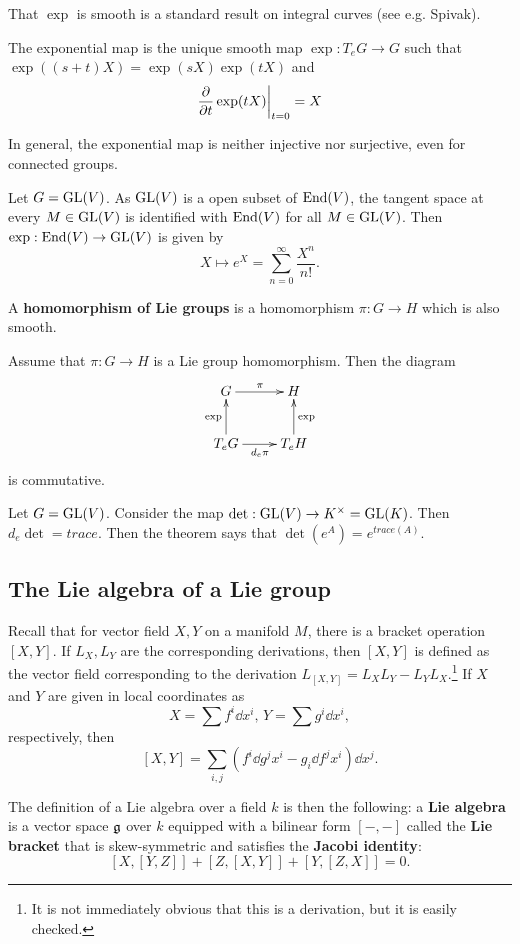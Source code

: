 \documentclass[11pt, english]{article}
\begin{document}
That $\exp$ is smooth is a standard result on integral curves (see e.g. Spivak).

\begin{thm}
  The exponential map is the unique smooth map $\exp:T_eG \to G$ such that $\exp((s+t)X) = \exp(sX)\exp(tX)$ and
$$
\restr{\dd{}{t} \exp(tX)}{t=0}=X
$$
\end{thm}
In general, the exponential map is neither injective nor surjective, even for connected groups.
\begin{example}
Let $G = \operatorname{GL}(V)$. As $\operatorname{GL}(V)$ is a open subset of $\operatorname{End}(V)$, the tangent space at every $M \in \operatorname{GL}(V)$ is identified with $\operatorname{End}(V)$ for all $M \in \operatorname{GL}(V)$. Then $\exp:\operatorname{End}(V) \to \operatorname{GL}(V)$ is given by 
$$
X \mapsto e^X = \sum_{n=0}^\infty \frac{X^n}{n!}.
$$
\end{example}

A \textbf{homomorphism of Lie groups} is a homomorphism $\pi:G \to H$ which is also smooth.

\begin{thm}
 Assume that $\pi:G \to H$ is a Lie group homomorphism. Then the diagram
$$
\xymatrix{
G \ar[r]^\pi & H \\
T_eG \ar[u]^{\exp} \ar[r]_{d_e\pi} & T_e H \ar[u]_\exp
}
$$
is commutative.
\end{thm}

\begin{example}
  Let $G = \operatorname{GL}(V)$. Consider the map $\det:\operatorname{GL}(V) \to K^\times = \operatorname{GL}(K)$. Then $d_e \det = trace$. Then the theorem says that $\det(e^A)=e^{trace(A)}$.
\end{example}

\subsection{The Lie algebra of a Lie group}

Recall that for vector field $X,Y$ on a manifold $M$, there is a bracket operation $[X,Y]$. If $L_X,L_Y$ are the corresponding derivations, then $[X,Y]$ is defined as the vector field corresponding to the derivation $L_{[X,Y]} = L_X L_Y - L_Y L_X$.\footnote{It is not immediately obvious that this is a derivation, but it is easily checked.} If $X$ and $Y$ are given in local coordinates as 
$$
X = \sum f^i \dd{}{x^i}, \, Y = \sum g^i \dd{}{x^i},
$$
respectively, then
$$
[X,Y] = \sum_{i,j} \left(f^i \dd{g^j}{x^i} - g_i \dd{f^j}{x^i} \right) \dd{}{x^j}.
$$

The definition of a Lie algebra over a field $k$ is then the following: a \textbf{Lie algebra} is a vector space $\mathfrak g$ over $k$ equipped with a bilinear form $[-,-]$ called the \textbf{Lie bracket} that is skew-symmetric and satisfies the \textbf{Jacobi identity}:
$$
[X,[Y,Z]] + [Z,[X,Y]] + [Y,[Z,X]] = 0.
$$
\end{document}
